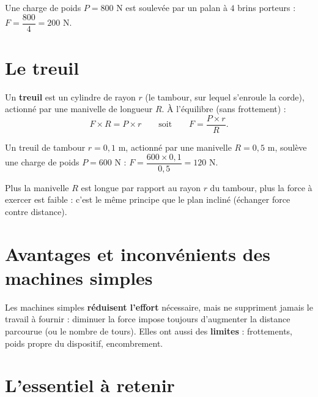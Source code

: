 \begin{exemple}
Une charge de poids $P=800$ N est soulevée par un palan à $4$ brins porteurs :
$F=\dfrac{800}4=200$ N.
\end{exemple}

\section{Le treuil}

\begin{propriete}[Treuil]
Un \textbf{treuil} est un cylindre de rayon $r$ (le tambour, sur lequel s'enroule la
corde), actionné par une manivelle de longueur $R$. À l'équilibre (sans frottement) :
\[
F\times R=P\times r \qquad\text{soit}\qquad F=\frac{P\times r}{R}.
\]
\end{propriete}

\begin{exemple}
Un treuil de tambour $r=0{,}1$ m, actionné par une manivelle $R=0{,}5$ m, soulève une
charge de poids $P=600$ N : $F=\dfrac{600\times0{,}1}{0{,}5}=120$ N.
\end{exemple}

\begin{remarque}
Plus la manivelle $R$ est longue par rapport au rayon $r$ du tambour, plus la force à
exercer est faible : c'est le même principe que le plan incliné (échanger force contre
distance).
\end{remarque}

\section{Avantages et inconvénients des machines simples}

\begin{propriete}[Bilan]
Les machines simples \textbf{réduisent l'effort} nécessaire, mais ne suppriment jamais le
travail à fournir : diminuer la force impose toujours d'augmenter la distance parcourue
(ou le nombre de tours). Elles ont aussi des \textbf{limites} : frottements, poids propre
du dispositif, encombrement.
\end{propriete}

\section{L'essentiel à retenir}


